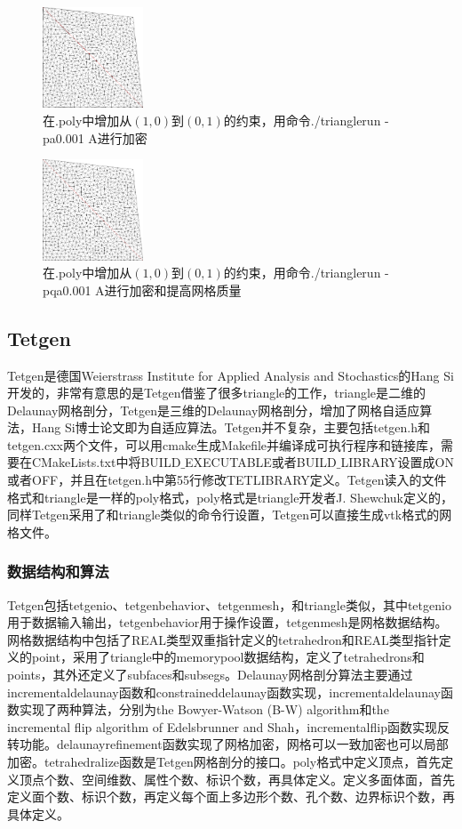 \begin{figure}[!htbp]
  \centering
  \includegraphics[height=3cm]{fig/1/11.png}
  \caption{在.poly中增加从$(1,0)$到$(0,1)$的约束，用命令./trianglerun -pa0.001 A进行加密}
  \label{fig:1-7}
\end{figure}

\begin{figure}[!htbp]
  \centering
  \includegraphics[height=3cm]{fig/1/12.png}
  \caption{在.poly中增加从$(1,0)$到$(0,1)$的约束，用命令./trianglerun -pqa0.001 A进行加密和提高网格质量}
  \label{fig:1-7}
\end{figure}


\subsection{Tetgen}

Tetgen是德国Weierstrass Institute for Applied Analysis and Stochastics的Hang Si开发的，非常有意思的是Tetgen借鉴了很多triangle的工作，triangle是二维的Delaunay网格剖分，Tetgen是三维的Delaunay网格剖分，增加了网格自适应算法，Hang Si博士论文即为自适应算法。Tetgen并不复杂，主要包括tetgen.h和tetgen.cxx两个文件，可以用cmake生成Makefile并编译成可执行程序和链接库，需要在CMakeLists.txt中将BUILD$\_$EXECUTABLE或者BUILD$\_$LIBRARY设置成ON或者OFF，并且在tetgen.h中第55行修改TETLIBRARY定义。Tetgen读入的文件格式和triangle是一样的poly格式，poly格式是triangle开发者J. Shewchuk定义的，同样Tetgen采用了和triangle类似的命令行设置，Tetgen可以直接生成vtk格式的网格文件。

\subsubsection{数据结构和算法}
Tetgen包括tetgenio、tetgenbehavior、tetgenmesh，和triangle类似，其中tetgenio用于数据输入输出，tetgenbehavior用于操作设置，tetgenmesh是网格数据结构。网格数据结构中包括了REAL类型双重指针定义的tetrahedron和REAL类型指针定义的point，采用了triangle中的memorypool数据结构，定义了tetrahedrons和points，其外还定义了subfaces和subsegs。Delaunay网格剖分算法主要通过incrementaldelaunay函数和constraineddelaunay函数实现，incrementaldelaunay函数实现了两种算法，分别为the Bowyer-Watson (B-W) algorithm和the incremental flip algorithm of Edelsbrunner and Shah，incrementalflip函数实现反转功能。delaunayrefinement函数实现了网格加密，网格可以一致加密也可以局部加密。tetrahedralize函数是Tetgen网格剖分的接口。poly格式中定义顶点，首先定义顶点个数、空间维数、属性个数、标识个数，再具体定义。定义多面体面，首先定义面个数、标识个数，再定义每个面上多边形个数、孔个数、边界标识个数，再具体定义。

